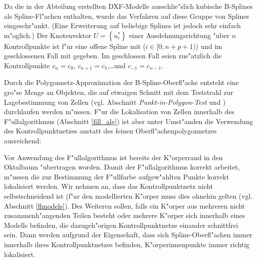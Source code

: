 Da die in der Abteilung erstellten DXF-Modelle ausschlie"slich kubische 
B-Splines als Spline-Fl"achen enthalten, wurde das Verfahren auf diese 
Gruppe von Splines eingeschr"ankt. (Eine Erweiterung auf beliebige Splines 
ist jedoch sehr einfach m"oglich.) 
Der Knotenvektor $U = \left\{u^\ast_i\right\}$ einer 
Ausdehnungsrichtung "uber $n$ Kontrollpunkte ist f"ur eine offene Spline mit 
($i \in [0; n+p+1)$) und im geschlossenen Fall mit
gegeben.
Im geschlossen Fall seien zus"atzlich die Kontrollpunkte $c_n=c_0$, 
$c_{n+1}=c_1$,\dots und $c_{-1}=c_{n-1}$.

Durch die Polygonnetz-Approximation der B-Spline-Oberfl"ache entsteht eine 
gro"se Menge an Objekten, die auf etwaigen Schnitt mit dem Teststrahl zur 
Lagebestimmung von Zellen (vgl. Abschnitt \emph{Punkt-in-Polygon-Test} 
 und ) durchlaufen werden m"ussen. 
F"ur die Lokalisation von Zellen innerhalb des F"ullalgorithmus (Abschnitt 
\ref{fill_alg}) ist aber unter Umst"anden die Verwendung des 
Kontrollpunktnetzes anstatt des feinen Oberfl"achenpolygonnetzes ausreichend: 

Vor Anwendung des F"ullalgorithmus ist bereits der K"orperrand in 
den Oktalbaum "ubertragen worden. Damit der F"ullalgorithmus korrekt arbeitet, 
m"ussen die zur Bestimmung der F"ullfarbe aufgew"ahlten Punkte korrekt 
lokalisiert werden. Wir nehmen an, dass das Kontrollpunktnetz nicht 
selbstschneidend ist (f"ur den modellierten K"orper muss dies ohnehin gelten 
(vgl. Abschnitt \ref{flmodels}). Des Weiteren sollen, falls ein K"orper aus 
mehreren nicht zusammenh"angenden Teilen besteht oder mehrere K"orper sich 
innerhalb eines Modells befinden, die dazugeh"origen Kontrollpunktnetze 
einander schnittfrei sein. Dann werden aufgrund der Eigenschaft, dass sich 
Spline-Oberfl"achen immer innerhalb ihres Kontrollpunktnetzes befinden, 
K"orperinnenpunkte immer richtig lokalisiert. 

